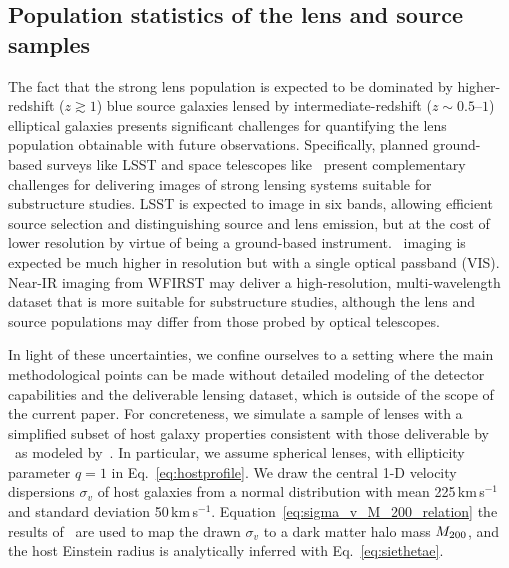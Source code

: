 \documentclass[twocolumn]{aastex62}
\begin{document}
\subsection{Population statistics of the lens and source samples}
\label{sec:populations}

The fact that the strong lens population is expected to be dominated by higher-redshift ($z\gtrsim1$) blue source galaxies lensed by intermediate-redshift ($z\sim 0.5$--$1$) elliptical galaxies presents significant challenges for quantifying the lens population obtainable with future observations. Specifically, planned ground-based surveys like LSST and space telescopes like \Euclid~present complementary challenges for delivering images of strong lensing systems suitable for substructure studies. LSST is expected to image in six bands, allowing efficient source selection and distinguishing source and lens emission, but at the cost of lower resolution by virtue of being a ground-based instrument. \Euclid~imaging is expected be much higher in resolution but with a single optical passband (VIS). Near-IR imaging from WFIRST may deliver a high-resolution, multi-wavelength dataset that is more suitable for substructure studies, although the lens and source populations may differ from those probed by optical telescopes.


In light of these uncertainties, we confine ourselves to a setting where the main methodological points can be made without detailed modeling of the detector capabilities and the deliverable lensing dataset, which is outside of the scope of the current paper. For concreteness, we simulate a sample of lenses with a simplified subset of host galaxy properties consistent with those deliverable by \Euclid~as modeled by~\citet{2015ApJ...811...20C}. In particular, we assume spherical lenses, with ellipticity parameter $q=1$ in Eq.~\ref{eq:hostprofile}. We draw the central 1-D velocity dispersions $\sigma_v$ of host galaxies from a normal distribution with mean 225\,km\,s$^{-1}$ and standard deviation 50\,km\,s$^{-1}$. Equation~\ref{eq:sigma_v_M_200_relation} the results of~\citet{2018ApJ...859...96Z} are used to map the drawn $\sigma_v$ to a dark matter halo mass $M_{200}$, and the host Einstein radius is analytically inferred with Eq.~\ref{eq:siethetae}.
\end{document}
